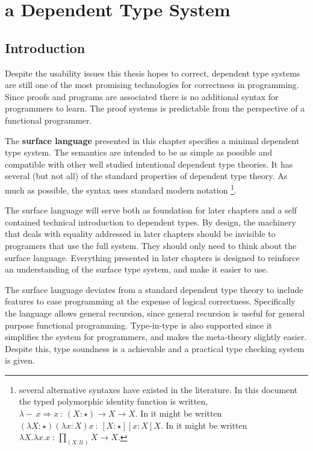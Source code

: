 \chapter{a Dependent Type System}
\label{chapter:Surface}
\thispagestyle{myheadings}

\section{Introduction}

Despite the usability issues this thesis hopes to correct, dependent
type systems are still one of the most promising technologies for
correctness in programming. Since proofs and programs are associated
there is no additional syntax for programmers to learn. The proof
systems is predictable from the perspective of a functional programmer.

The \textbf{surface language}
presented in this chapter specifies a minimal dependent type system.
The semantics are intended to be as simple as possible and compatible
with other well studied intentional dependent type theories. It has
several (but not all) of the standard properties of dependent type
theory. As much as possible, the syntax uses standard modern notation
\footnote{several alternative syntaxes have existed in the literature. In this
document the typed polymorphic identity function is written, $\lambda-\,x\Rightarrow x\ :\,\left(X:\star\right)\rightarrow X\rightarrow X$.
In \cite{10.1016/0890-5401(88)90005-3} it might be written $\left(\lambda X:\star\right)\left(\lambda x:X\right)x\ :\,\left[X:\star\right]\left[x:X\right]X$.
In \cite{HoTTbook} it might be written $\lambda X.\lambda x.x\ :\,\underset{\left(X:\mathcal{U}\right)}{\prod}X\rightarrow X$.}. 

The surface language will serve both as foundation for later chapters
and a self contained technical introduction to dependent types. By
design, the machinery that deals with equality addressed in later
chapters should be invisible to programers that use the full system.
They should only need to think about the surface language. Everything
presented in later chapters is designed to reinforce an understanding
of the surface type system, and make it easier to use.


The surface language deviates from a standard dependent type theory
to include features to ease programming at the expense of logical
correctness. Specifically the language allows general recursion, since
general recursion is useful for general purpose functional programming.
Type-in-type is also supported since it simplifies the system for
programmers, and makes the meta-theory slightly easier. Despite this,
type soundness is a achievable and a practical type checking system
is given.

